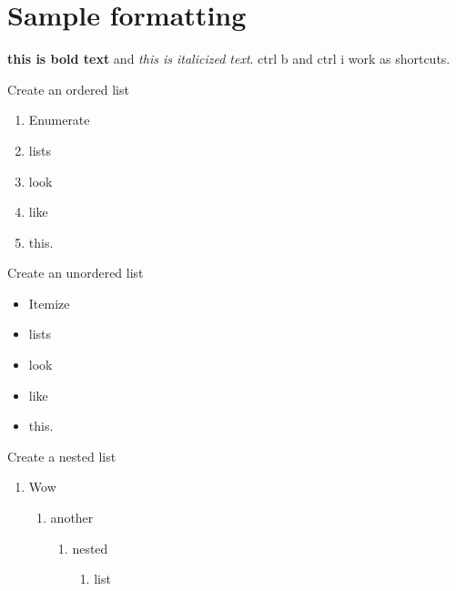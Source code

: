 \section{Sample formatting}

\textbf{this is bold text} and \textit{this is italicized text}. ctrl b and ctrl i work as shortcuts. 

Create an ordered list 

\begin{enumerate}
    \item Enumerate
    \item lists
    \item look
    \item like
    \item this.
\end{enumerate}

Create an unordered list 

\begin{itemize}
    \item Itemize
    \item lists
    \item look
    \item like
    \item this.
\end{itemize}

Create a nested list 

\begin{enumerate}
    \item Wow
    \begin{enumerate}
        \item another
        \begin{enumerate}
            \item nested
            \begin{enumerate}
                \item list
            \end{enumerate}
        \end{enumerate}
    \end{enumerate}
\end{enumerate}